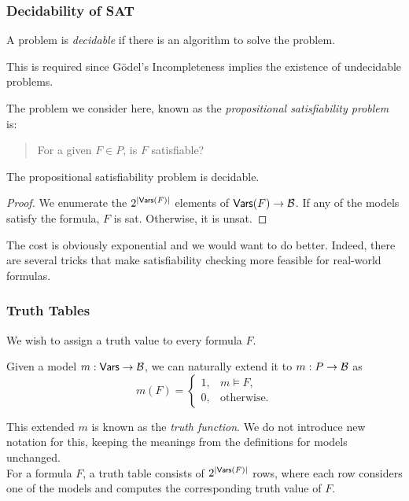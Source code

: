 \subsubsection{Decidability of SAT}

\begin{fdef}
A problem is \textit{decidable} if there is an algorithm to solve the problem.
\end{fdef}

This is required since G\"odel's Incompleteness implies the existence of undecidable problems.

The problem we consider here, known as the \textit{propositional satisfiability problem} is:
\begin{quote}
For a given $F\in P$, is $F$ satisfiable?
\end{quote}

\begin{theorem}
The propositional satisfiability problem is decidable.
\end{theorem}
\begin{proof}
We enumerate the $2^{|\mathsf{Vars}(F)|}$ elements of $\mathsf{Vars}(F)\to\mathcal{B}$. If any of the models satisfy the formula, $F$ is sat. Otherwise, it is unsat.
\end{proof}

The cost is obviously exponential and we would want to do better. Indeed, there are several tricks that make satisfiability checking more feasible for real-world formulas.

\subsubsection{Truth Tables}

We wish to assign a truth value to every formula $F$.

Given a model $m:\mathsf{Vars}\to\mathcal{B}$, we can naturally extend it to $m:P\to \mathcal{B}$ as
\[
	m(F) = 
	\begin{cases}
	1, & m\vDash F, \\
	0, & \text{otherwise.}
	\end{cases}
\]

This extended $m$ is known as the \textit{truth function}. We do not introduce new notation for this, keeping the meanings from the definitions for models unchanged.\\

For a formula $F$, a truth table consists of $2^{|\mathsf{Vars}(F)|}$ rows, where each row considers one of the models and computes the corresponding truth value of $F$.

